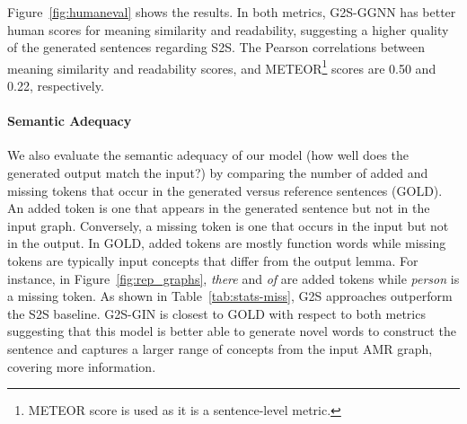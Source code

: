 \documentclass[11pt,a4paper]{article}
\begin{document}
Figure~\ref{fig:humaneval} shows the results. In both metrics, {\selectfont G2S-GGNN} has better human scores for meaning similarity and readability, suggesting a higher quality of the generated sentences regarding {\selectfont S2S}. The Pearson correlations between meaning similarity and readability scores, and METEOR\footnote{METEOR score is used as it is a sentence-level metric.} scores are 0.50 and 0.22, respectively.



\paragraph{Semantic Adequacy}
We also evaluate the semantic adequacy of our model (how well does the generated output match the input?) by comparing the number of added and missing tokens that occur in the generated versus reference sentences ({\selectfont GOLD}). An added token is one that appears in the generated sentence but not in the input graph. Conversely, a missing token is one that occurs in the input but not in the output. In {\selectfont GOLD}, added tokens are mostly function words while missing tokens are typically input concepts that differ from the output lemma. For instance, in Figure~\ref{fig:rep_graphs}, \textit{there} and \textit{of} are added tokens while \textit{person} is a missing token. 
As shown in Table~\ref{tab:stats-miss}, {\selectfont G2S} approaches outperform the {\selectfont S2S} baseline. {\selectfont G2S-GIN} is closest to {\selectfont GOLD} with respect to both metrics suggesting that this model is better able to generate novel words to construct the sentence and captures a larger range of concepts from the input AMR graph, covering more information.
\end{document}
